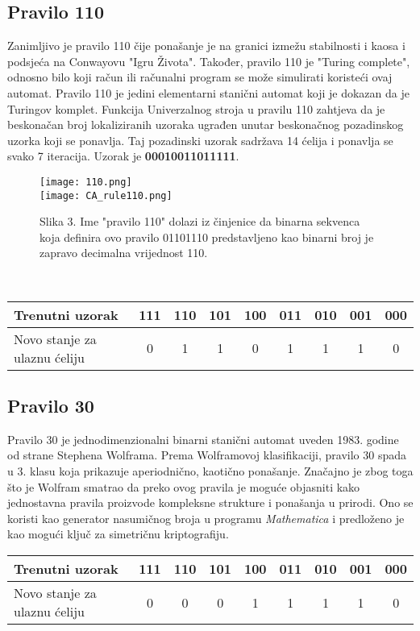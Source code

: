 \documentclass[11pt]{article}
\makeatletter
\def\maxwidth{\ifdim\Gin@nat@width>\linewidth\linewidth
    \else\Gin@nat@width\fi}
\let\Oldincludegraphics\includegraphics
\renewcommand{\includegraphics}[1]{\Oldincludegraphics[width=.8\maxwidth]{#1}}
\makeatother
\begin{document}
\subsection{Pravilo 110}\label{pravilo-110}

Zanimljivo je pravilo 110 čije ponašanje je na granici izmežu
stabilnosti i kaosa i podsjeća na Conwayovu "Igru Života". Također,
pravilo 110 je "Turing complete", odnosno bilo koji račun ili računalni
program se može simulirati koristeći ovaj automat. Pravilo 110 je jedini
elementarni stanični automat koji je dokazan da je Turingov komplet.
Funkcija Univerzalnog stroja u pravilu 110 zahtjeva da je beskonačan
broj lokaliziranih uzoraka ugrađen unutar beskonačnog pozadinskog uzorka
koji se ponavlja. Taj pozadinski uzorak sadržava 14 ćelija i ponavlja se
svako 7 iteracija. Uzorak je \textbf{00010011011111}.

\begin{figure}
\centering
\texttt{[image: 110.png]} \\
\texttt{[image: CA\_rule110.png]}
\caption{Slika 3. Ime "pravilo
110" dolazi iz činjenice da binarna sekvenca koja definira ovo pravilo
01101110 predstavljeno kao binarni broj je zapravo decimalna vrijednost
110.}
\end{figure}
\
\begin{center}
\begin{tabular}{l||c|c|c|c|c|c|c|c}
Trenutni uzorak & 111 & 110 & 101 & 100 & 011 & 010 & 001 & 000 \\
\hline
Novo stanje za ulaznu ćeliju   & 0 & 1 & 1 & 0 & 1 & 1 & 1 & 0 
\end{tabular}
\end{center}
\clearpage

\subsection{Pravilo 30}\label{pravilo-30}

Pravilo 30 je jednodimenzionalni binarni stanični automat uveden 1983.
godine od strane Stephena Wolframa. Prema Wolframovoj klasifikaciji,
pravilo 30 spada u 3. klasu koja prikazuje aperiodnično, kaotično
ponašanje. Značajno je zbog toga što je Wolfram smatrao da preko ovog
pravila je moguće objasniti kako jednostavna pravila proizvode
kompleksne strukture i ponašanja u prirodi. Ono se koristi kao generator
nasumičnog broja u programu \emph{Mathematica} i predloženo je kao
mogući ključ za simetričnu kriptografiju.


\begin{center}
\begin{tabular}{l||c|c|c|c|c|c|c|c}
Trenutni uzorak & 111 & 110 & 101 & 100 & 011 & 010 & 001 & 000 \\
\hline
Novo stanje za ulaznu ćeliju   & 0 & 0 & 0 & 1 & 1 & 1 & 1 & 0 
\end{tabular}
\end{center}
\end{document}
